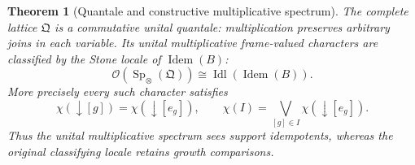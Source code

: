 \documentclass[11pt,a4paper]{article}
\numberwithin{algorithm}{section}
\numberwithin{equation}{section}
\newtheorem{theorem}{Theorem}[section]
\theoremstyle{definition}
\theoremstyle{remark}
\theoremstyle{plain}
\newcommand{\OO}{\mathcal O}
\newcommand{\Idl}{\operatorname{Idl}}
\theoremstyle{definition}
\theoremstyle{plain}
\begin{document}
\begin{theorem}[Quantale and constructive multiplicative spectrum]
\label{thm:resource-spectrum}
The complete lattice $\mathfrak Q$ is a commutative unital
quantale: multiplication preserves arbitrary joins in each variable.
Its unital multiplicative frame-valued characters are classified
by the Stone locale of $\operatorname{Idem}(B)$:
\begin{equation}\label{eq:support-spectrum-frame}
 \OO(\operatorname{Sp}_{\otimes}(\mathfrak Q))
 \cong\Idl(\operatorname{Idem}(B)).
\end{equation}
More precisely every such character satisfies
\begin{equation}\label{eq:spectrum-support-only}
 \chi(\downarrow[g])=\chi(\downarrow[e_g]),
 \qquad
 \chi(I)=\bigvee_{[g]\in I}\chi(\downarrow[e_g]).
\end{equation}
Thus the unital multiplicative spectrum sees support idempotents,
whereas the original classifying locale retains growth comparisons.
\end{theorem}
\end{document}
